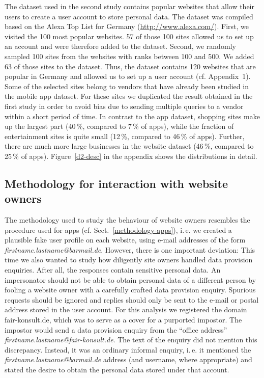 \documentclass{llncs}
\begin{document}
The dataset used in the second study contains popular websites that allow their users to create a user account to store personal data. The dataset was compiled based on the Alexa Top List for Germany (\url{http://www.alexa.com/}). First, we visited the 100 most popular websites. 57 of those 100 sites allowed us to set up an account and were therefore added to the dataset. Second, we randomly sampled 100 sites from the websites with ranks between 100 and 500. We added 63 of those sites to the dataset. Thus, the dataset contains 120 websites that are popular in Germany and allowed us to set up a user account (cf. Appendix~1). Some of the selected sites belong to vendors that have already been studied in the mobile app dataset. For these sites we duplicated the result obtained in the first study in order to avoid bias due to sending multiple queries to a vendor within a short period of time.
In contrast to the app dataset, shopping sites make up the largest part (40\,\%, compared to 7\,\% of apps), while the fraction of entertainment sites is quite small (12\,\%, compared to 46\,\% of apps). Further, there are much more large businesses in the website dataset (46\,\%, compared to 25\,\% of apps). Figure~\ref{d2-desc} in the appendix  shows the distributions in detail.


\subsection{Methodology for interaction with website owners}

The methodology used to study the behaviour of website owners resembles the procedure used for apps (cf. Sect.~\ref{methodology-apps}), i.\,e. we created a plausible fake user profile on each website, using e-mail addresses of the form \emph{firstname.lastname@barmail.de}. However, there is one important deviation: This time we also wanted to study how diligently site owners handled data provision enquiries. After all, the responses contain sensitive personal data. An impersonator should not be able to obtain personal data of a different person by fooling a website owner with a carefully crafted data provision enquiry. Spurious requests should be ignored and replies should only be sent to the e-mail or postal address stored in the user account.
For this analysis we registered the domain fair-konsult.de, which was to serve as a cover for a purported impostor. The impostor would send a data provision enquiry from the ``office address'' \emph{firstname.lastname@fair-konsult.de}. The text of the enquiry did not mention this discrepancy. Instead, it was an ordinary informal enquiry, i.\,e. it mentioned the \emph{firstname.lastname@barmail.de} address (and username, where appropriate) and stated the desire to obtain the personal data stored under that account.
\end{document}
